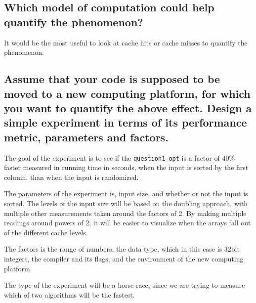 \subsection{Which model of computation could help quantify the phenomenon?}
It would be the most useful to look at cache hits or cache misses to quantify the phenomenon.

\subsection{ Assume that your code is supposed to be moved to a new computing platform, for which you	want to quantify the above effect. Design a simple experiment in terms of its performance metric, parameters and factors.}
The goal of the experiment is to see if the \texttt{question1\_opt} is a factor of $40\%$ faster measured in running time in seconds, when the input is sorted by the first column, than when the input is randomized.

The parameters of the experiment is, input size, and whether or not the input is sorted. The levels of the input size will be based on the doubling approach, with multiple other measurements taken around the factors of 2. By making multiple readings around powers of 2, it will be easier to visualize when the arrays fall out of the different cache levels.

The factors is the range of numbers, the data type, which in this case is 32bit integers, the compiler and its flags, and the environment of the new computing platform.

The type of the experiment will be a horse race, since we are trying to measure which of two algorithms will be the fastest.
